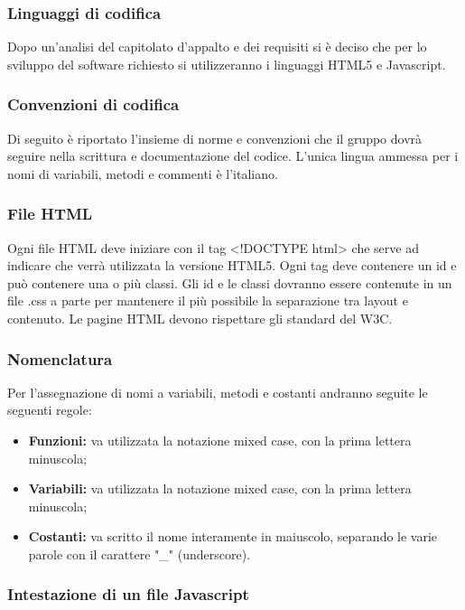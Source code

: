\subsubsection{Linguaggi di codifica}
Dopo un'analisi del capitolato d'appalto e dei requisiti si è deciso che per lo sviluppo del software richiesto si utilizzeranno i linguaggi \gls{HTML5} e \gls{Javascript}.

\subsubsection{Convenzioni di codifica}
Di seguito è riportato l'insieme di norme e convenzioni che il gruppo dovrà seguire nella scrittura e documentazione del codice.
L'unica lingua ammessa per i nomi di variabili, metodi e commenti è l'italiano.

\subsubsection{File HTML}

Ogni file \gls{HTML} deve iniziare con il tag <!DOCTYPE html> che serve ad indicare che verrà utilizzata la versione \gls{HTML5}.
Ogni tag deve contenere un id e può contenere una o più classi.
Gli id e le classi dovranno essere contenute in un file .css a parte per mantenere il più possibile la separazione tra \gls{layout} e contenuto.
Le pagine \gls{HTML} devono rispettare gli standard del \gls{W3C}.

\subsubsection{Nomenclatura}
Per l'assegnazione di nomi a variabili, metodi e costanti andranno seguite le seguenti regole:
\begin{itemize}
	\item \textbf{Funzioni:} va utilizzata la notazione mixed case, con la prima lettera minuscola;
	\item \textbf{Variabili:} va utilizzata la notazione mixed case, con la prima lettera minuscola;
	\item \textbf{Costanti:} va scritto il nome interamente in maiuscolo, separando le varie parole con il carattere "\_" (underscore).
\end{itemize}

\subsubsection{Intestazione di un file Javascript}

